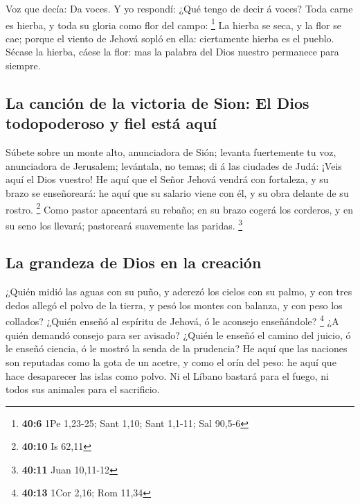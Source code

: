  Voz que decía: Da voces. Y yo respondí: ¿Qué tengo de decir
á voces? Toda carne es hierba, y toda su gloria como flor del campo:
\footnote{\textbf{40:6} 1Pe 1,23-25; Sant 1,10; Sant 1,1-11; Sal 90,5-6}
 La hierba se seca, y la flor se cae; porque el viento de
Jehová sopló en ella: ciertamente hierba es el pueblo. 
Sécase la hierba, cáese la flor: mas la palabra del Dios nuestro
permanece para siempre.

\hypertarget{la-canciuxf3n-de-la-victoria-de-sion-el-dios-todopoderoso-y-fiel-estuxe1-aquuxed}{%
\subsection{La canción de la victoria de Sion: El Dios todopoderoso y
fiel está
aquí}\label{la-canciuxf3n-de-la-victoria-de-sion-el-dios-todopoderoso-y-fiel-estuxe1-aquuxed}}

 Súbete sobre un monte alto, anunciadora de Sión; levanta
fuertemente tu voz, anunciadora de Jerusalem; levántala, no temas; di á
las ciudades de Judá: ¡Veis aquí el Dios vuestro!  He aquí
que el Señor Jehová vendrá con fortaleza, y su brazo se enseñoreará: he
aquí que su salario viene con él, y su obra delante de su rostro.
\footnote{\textbf{40:10} Is 62,11}  Como pastor apacentará
su rebaño; en su brazo cogerá los corderos, y en su seno los llevará;
pastoreará suavemente las paridas. \footnote{\textbf{40:11} Juan
  10,11-12}

\hypertarget{la-grandeza-de-dios-en-la-creaciuxf3n}{%
\subsection{La grandeza de Dios en la
creación}\label{la-grandeza-de-dios-en-la-creaciuxf3n}}

 ¿Quién midió las aguas con su puño, y aderezó los cielos
con su palmo, y con tres dedos allegó el polvo de la tierra, y pesó los
montes con balanza, y con peso los collados?  ¿Quién enseñó
al espíritu de Jehová, ó le aconsejo enseñándole? \footnote{\textbf{40:13}
  1Cor 2,16; Rom 11,34}  ¿A quién demandó consejo para ser
avisado? ¿Quién le enseñó el camino del juicio, ó le enseñó ciencia, ó
le mostró la senda de la prudencia?  He aquí que las
naciones son reputadas como la gota de un acetre, y como el orín del
peso: he aquí que hace desaparecer las islas como polvo. 
Ni el Líbano bastará para el fuego, ni todos sus animales para el
sacrificio.


